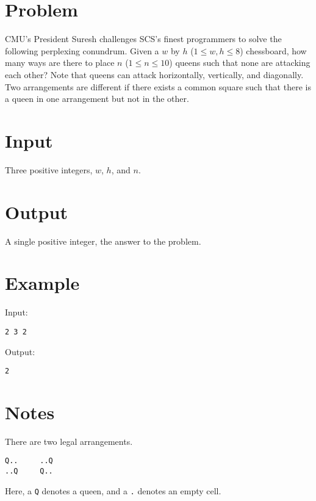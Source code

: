 \documentclass[11pt]{article}
\begin{document}
\section*{Problem}
\noindent CMU's President Suresh challenges SCS's finest programmers to solve the following perplexing conundrum. Given a $w$ by $h$ ($1 \le  w, h \le  8$) chessboard, how many ways are there to place $n$ ($1 \le  n \le  10$) queens such that none are attacking each other? Note that queens can attack horizontally, vertically, and diagonally.
Two arrangements are different if there exists a common square such that there is a queen in one arrangement but not in the other.
\section*{Input}
Three positive integers, $w$, $h$, and $n$.
\section*{Output}
A single positive integer, the answer to the problem.
\section*{Example}
Input:

\begin{verbatim}
2 3 2
\end{verbatim}

\noindent Output:

\begin{verbatim}
2
\end{verbatim}

\section*{Notes}
There are two legal arrangements.
\begin{verbatim}
Q..     ..Q
..Q     Q..
\end{verbatim}
Here, a \texttt{Q} denotes a queen, and a \texttt{.} denotes an empty cell.
\end{document}
